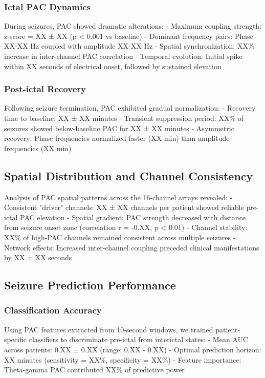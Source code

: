 \subsubsection{Ictal PAC Dynamics}
During seizures, PAC showed dramatic alterations:
- Maximum coupling strength: z-score = XX ± XX (p < 0.001 vs baseline)
- Dominant frequency pairs: Phase XX-XX Hz coupled with amplitude XX-XX Hz
- Spatial synchronization: XX\% increase in inter-channel PAC correlation
- Temporal evolution: Initial spike within XX seconds of electrical onset, followed by sustained elevation

\subsubsection{Post-ictal Recovery}
Following seizure termination, PAC exhibited gradual normalization:
- Recovery time to baseline: XX ± XX minutes
- Transient suppression period: XX\% of seizures showed below-baseline PAC for XX ± XX minutes
- Asymmetric recovery: Phase frequencies normalized faster (XX min) than amplitude frequencies (XX min)

\subsection{Spatial Distribution and Channel Consistency}

Analysis of PAC spatial patterns across the 16-channel arrays revealed:
- Consistent "driver" channels: XX ± XX channels per patient showed reliable pre-ictal PAC elevation
- Spatial gradient: PAC strength decreased with distance from seizure onset zone (correlation r = -0.XX, p < 0.01)
- Channel stability: XX\% of high-PAC channels remained consistent across multiple seizures
- Network effects: Increased inter-channel coupling preceded clinical manifestations by XX ± XX seconds

\subsection{Seizure Prediction Performance}

\subsubsection{Classification Accuracy}
Using PAC features extracted from 10-second windows, we trained patient-specific classifiers to discriminate pre-ictal from interictal states:
- Mean AUC across patients: 0.XX ± 0.XX (range: 0.XX - 0.XX)
- Optimal prediction horizon: XX minutes (sensitivity = XX\%, specificity = XX\%)
- Feature importance: Theta-gamma PAC contributed XX\% of predictive power

